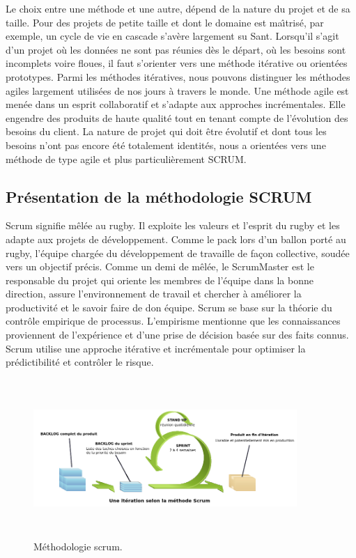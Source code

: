 Le choix entre une m\'{e}thode et une autre, d\'{e}pend de la nature du projet et de sa taille. Pour des
projets de petite taille et dont le domaine est ma\^{\i}tris\'{e}, par exemple, un cycle de vie en cascade
s'av\`{e}re largement su Sant. Lorsqu'il s'agit d'un projet o\`{u} les donn\'{e}es ne sont pas r\'{e}unies d\`{e}s le
d\'{e}part, o\`{u} les besoins sont incomplets voire floues, il faut s'orienter vers une m\'{e}thode it\'{e}rative
ou orient\'{e}es prototypes.
Parmi les m\'{e}thodes it\'{e}ratives, nous pouvons distinguer les m\'{e}thodes agiles largement utilis\'{e}es
de nos jours \`{a} travers le monde. Une m\'{e}thode agile est men\'{e}e dans un esprit collaboratif et
s'adapte aux approches incr\'{e}mentales. Elle engendre des produits de haute qualit\'{e} tout en tenant
compte de l'\'{e}volution des besoins du client.
La nature de projet qui doit \^{e}tre \'{e}volutif et dont tous les besoins n'ont pas encore \'{e}t\'{e}
totalement identit\'{e}s, nous a orient\'{e}es vers une m\'{e}thode de type agile et plus particuli\`{e}rement
SCRUM.
  \subsection{Pr\'{e}sentation de la m\'{e}thodologie SCRUM}
Scrum signifie m\^{e}l\'{e}e au rugby. Il exploite les valeurs et l'esprit du rugby et les adapte aux
projets de d\'{e}veloppement. Comme le pack lors d'un ballon port\'{e} au rugby, l'\'{e}quipe charg\'{e}e du
d\'{e}veloppement de travaille de fa\c{c}on collective, soud\'{e}e vers un objectif pr\'{e}cis. Comme un demi
de m\^{e}l\'{e}e, le ScrumMaster est le responsable du projet qui oriente les membres de l'\'{e}quipe dans
la bonne direction, assure l'environnement de travail et chercher \`{a} am\'{e}liorer la productivit\'{e} et
le savoir faire de don \'{e}quipe.
Scrum se base sur la th\'{e}orie du contr\^{o}le empirique de processus. L'empirisme mentionne que
les connaissances proviennent de l'exp\'{e}rience et d'une prise de d\'{e}cision bas\'{e}e sur des faits
connus. Scrum utilise une approche it\'{e}rative et incr\'{e}mentale pour optimiser la pr\'{e}dictibilit\'{e} et
contr\^{o}ler le risque.
\begin{figure}[H]
\center
\includegraphics[width=10cm,height=6cm]{./figures/scrum.png}
\caption{M\'{e}thodologie scrum.}

\end{figure}

